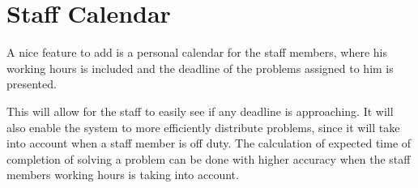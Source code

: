 \section{Staff Calendar}
\label{sec:staffCalendar}
A nice feature to add is a personal calendar for the staff members, where his working hours is included and the deadline of the problems assigned to him is presented. 

This will allow for the staff to easily see if any deadline is approaching. 
It will also enable the system to more efficiently distribute problems, since it will take into account when a staff member is off duty. 
The calculation of expected time of completion of solving a problem can be done with higher accuracy when the staff members working hours is taking into account. 
